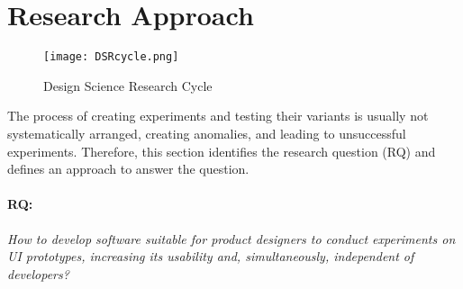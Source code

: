 \section{Research Approach}  %
\label{introduction:section:research}

\begin{figure}[ht]
    \centering
    \texttt{[image: DSRcycle.png]}
    \caption{Design Science Research Cycle \cite{paper:designprinciple:vk}}
    \label{intro:fig:dps}
\end{figure}
The process of creating experiments and testing their variants is usually not systematically arranged, creating anomalies, and leading to unsuccessful experiments.
Therefore, this section identifies the research question (RQ) and defines an approach to answer the question.

\paragraph{RQ:} \textit{How to develop software suitable for product designers to conduct experiments on UI prototypes, increasing its usability and, simultaneously, independent of developers?}\\

